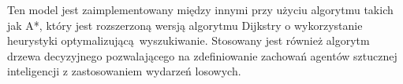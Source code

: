 Ten model jest zaimplementowany między innymi przy użyciu algorytmu takich jak A*, który jest rozszerzoną wersją algorytmu Dijkstry o wykorzystanie heurystyki 
optymalizującą wyszukiwanie. Stosowany jest również algorytm drzewa decyzyjnego pozwalającego na zdefiniowanie zachowań agentów sztucznej inteligencji z zastosowaniem wydarzeń losowych.
